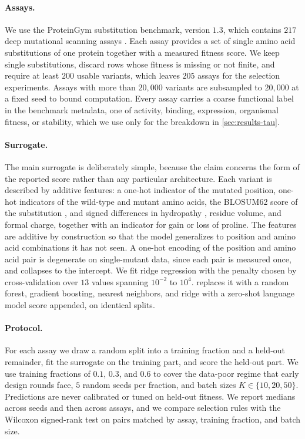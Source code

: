 \documentclass{article}
\theoremstyle{plain}
\theoremstyle{definition}
\begin{document}
\paragraph{Assays.}
We use the ProteinGym substitution benchmark, version $1.3$, which contains $217$ deep
mutational scanning assays \citep{notin2023proteingym}. Each assay provides a set of
single amino acid substitutions of one protein together with a measured fitness score.
We keep single substitutions, discard rows whose fitness is missing or not finite, and
require at least $200$ usable variants, which leaves $205$ assays for the selection
experiments. Assays with more than $20{,}000$ variants are subsampled to $20{,}000$ at a
fixed seed to bound computation. Every assay carries a coarse functional label in the
benchmark metadata, one of activity, binding, expression, organismal fitness, or
stability, which we use only for the breakdown in \cref{sec:results-tau}.

\paragraph{Surrogate.}
The main surrogate is deliberately simple, because the claim concerns the form of the
reported score rather than any particular architecture. Each variant is described by additive features: a one-hot
indicator of the mutated position, one-hot indicators of the wild-type and mutant amino
acids, the BLOSUM62 score of the substitution \citep{henikoff1992amino}, and signed
differences in hydropathy \citep{kyte1982simple}, residue volume, and formal charge,
together with an indicator for gain or loss of proline. The features are additive by
construction so that the model generalizes to position and amino acid combinations it
has not seen. A one-hot encoding of the position and amino acid pair is degenerate on
single-mutant data, since each pair is measured once, and collapses to the intercept.
We fit ridge regression with the penalty chosen by cross-validation over $13$ values
spanning $10^{-2}$ to $10^{4}$.  replaces it with a random
forest, gradient boosting, nearest neighbors, and ridge with a zero-shot language model
score appended, on identical splits.

\paragraph{Protocol.}
For each assay we draw a random split into a training fraction and a held-out
remainder, fit the surrogate on the training part, and score the held-out part. We use
training fractions of $0.1$, $0.3$, and $0.6$ to cover the data-poor regime that early
design rounds face, $5$ random seeds per fraction, and batch sizes $K \in \{10, 20,
50\}$. Predictions are never calibrated or tuned on held-out fitness. We report medians
across seeds and then across assays, and we compare selection rules with the Wilcoxon
signed-rank test on pairs matched by assay, training fraction, and batch size.
\end{document}
